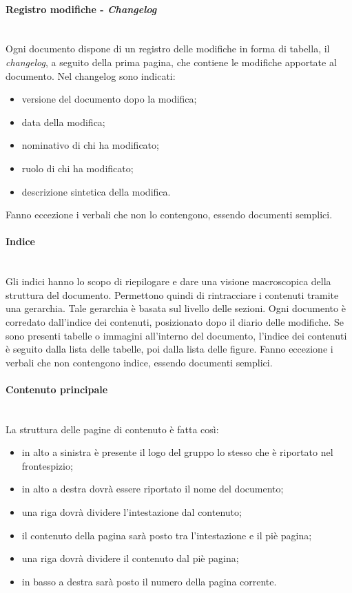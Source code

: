 		\paragraph{Registro modifiche - \textit{Changelog}} \mbox{}\\
		Ogni documento dispone di un registro delle modifiche in forma di tabella, il \textit{changelog}, a seguito della prima pagina, che contiene le modifiche apportate al documento. Nel changelog sono indicati:
		\begin{itemize}
			\item versione del documento dopo la modifica;
			\item data della modifica;
			\item nominativo di chi ha modificato;
			\item ruolo di chi ha modificato;
			\item descrizione sintetica della modifica.
		\end{itemize}
		Fanno eccezione i verbali che non lo contengono, essendo documenti semplici.
		\paragraph{Indice} \mbox{}\\
		Gli indici hanno lo scopo di riepilogare e dare una visione macroscopica della struttura del documento. Permettono quindi di rintracciare i contenuti tramite una gerarchia. Tale gerarchia è basata sul livello delle sezioni.\newline 
		Ogni documento è corredato dall'indice dei contenuti, posizionato dopo il diario delle modifiche. Se sono presenti tabelle o immagini all'interno del documento, l'indice dei contenuti è seguito dalla lista delle tabelle, poi dalla lista delle figure.\newline
		Fanno eccezione i verbali che non contengono indice, essendo documenti semplici.
		\paragraph{Contenuto principale} \mbox{}\\
		La struttura delle pagine di contenuto è fatta così:
		\begin{itemize}
			\item in alto a sinistra è presente il logo del gruppo lo stesso che è riportato nel frontespizio;
			\item in alto a destra dovrà essere riportato il nome del documento;
			\item una riga dovrà dividere l'intestazione dal contenuto;
			\item il contenuto della pagina sarà posto tra l'intestazione e il piè pagina;
			\item una riga dovrà dividere il contenuto dal piè pagina;
			\item in basso a destra sarà posto il numero della pagina corrente.
		\end{itemize}
